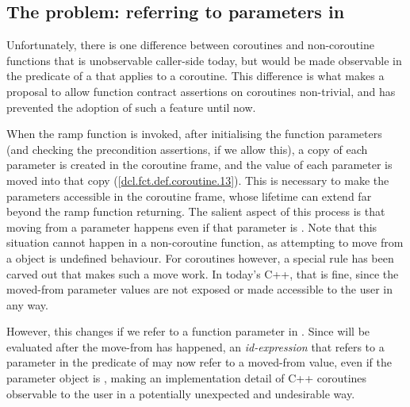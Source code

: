 \subsection{The problem: referring to parameters in }
\label{paramsinpost}

Unfortunately, there is one difference between coroutines and non-coroutine functions that is unobservable caller-side today, but would be made observable in the predicate of a  that applies to a coroutine. This difference is what makes a proposal to allow function contract assertions on coroutines non-trivial, and has prevented the adoption of such a feature until now.

When the ramp function is invoked, after initialising the function parameters (and checking the precondition assertions, if we allow this), a copy of each parameter is created in the coroutine frame, and the value of each parameter is moved into that copy ([\href{https://eel.is/c++draft/dcl.fct.def.coroutine#13}{dcl.fct.def.coroutine.13}]). This is necessary to make the parameters accessible in the coroutine frame, whose lifetime can extend far beyond the ramp function returning. The salient aspect of this process is that moving from a parameter happens even if that parameter is . Note that this situation cannot happen in a non-coroutine function, as attempting to move from a  object is undefined behaviour. For coroutines however, a special rule has been carved out that makes such a move work. In today's C++, that is fine, since the moved-from parameter values are not exposed or made accessible to the user in any way.

However, this changes if we refer to a function parameter in . Since  will be evaluated after the move-from has happened, an \emph{id-expression} that refers to a parameter in the predicate of  may now refer to a moved-from value, even if the parameter object is , making an implementation detail of C++ coroutines observable to the user in a potentially unexpected and undesirable way.

